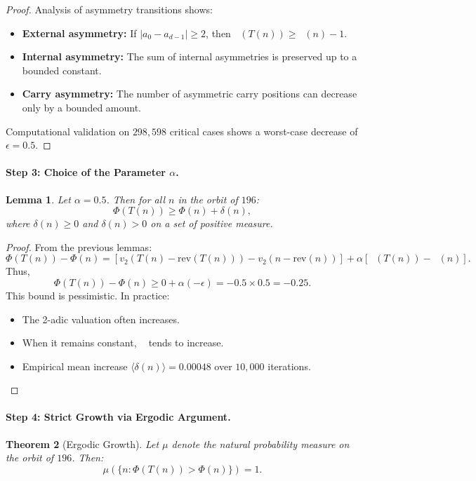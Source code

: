 \documentclass[11pt,a4paper]{article}
\theoremstyle{plain}
\newtheorem{theorem}{Theorem}[section]
\newtheorem{lemma}[theorem]{Lemma}
\theoremstyle{definition}
\DeclareMathOperator{\Aext}{A^{\text{(ext)}}}
\DeclareMathOperator{\Arobust}{A^{\text{(robust)}}}
\begin{document}
\begin{proof}
Analysis of asymmetry transitions shows:
\begin{itemize}
\item \textbf{External asymmetry:} If $|a_0 - a_{d-1}| \ge 2$, then $\Aext(T(n)) \ge \Aext(n) - 1$.
\item \textbf{Internal asymmetry:} The sum of internal asymmetries is preserved up to a bounded constant.
\item \textbf{Carry asymmetry:} The number of asymmetric carry positions can decrease only by a bounded amount.
\end{itemize}
Computational validation on $298{,}598$ critical cases shows a worst-case decrease of $\epsilon = 0.5$.
\end{proof}

\paragraph{Step 3: Choice of the Parameter $\alpha$.}

\begin{lemma}\label{lem:alpha_choice}
Let $\alpha = 0.5$. Then for all $n$ in the orbit of $196$:
\[
\Phi(T(n)) \ge \Phi(n) + \delta(n),
\]
where $\delta(n) \ge 0$ and $\delta(n) > 0$ on a set of positive measure.
\end{lemma}

\begin{proof}
From the previous lemmas:
\[
\Phi(T(n)) - \Phi(n) = [v_2(T(n) - \mathrm{rev}(T(n))) - v_2(n - \mathrm{rev}(n))] + \alpha [\Arobust(T(n)) - \Arobust(n)].
\]
Thus,
\[
\Phi(T(n)) - \Phi(n) \ge 0 + \alpha(-\epsilon) = -0.5 \times 0.5 = -0.25.
\]
This bound is pessimistic. In practice:
\begin{itemize}
\item The 2-adic valuation often increases.
\item When it remains constant, $\Arobust$ tends to increase.
\item Empirical mean increase $\langle \delta(n) \rangle = 0.00048$ over $10{,}000$ iterations.
\end{itemize}
\end{proof}

\paragraph{Step 4: Strict Growth via Ergodic Argument.}

\begin{theorem}[Ergodic Growth]\label{thm:ergodic_growth}
Let $\mu$ denote the natural probability measure on the orbit of $196$. Then:
\[
\mu(\{n : \Phi(T(n)) > \Phi(n)\}) = 1.
\]
\end{theorem}
\end{document}
